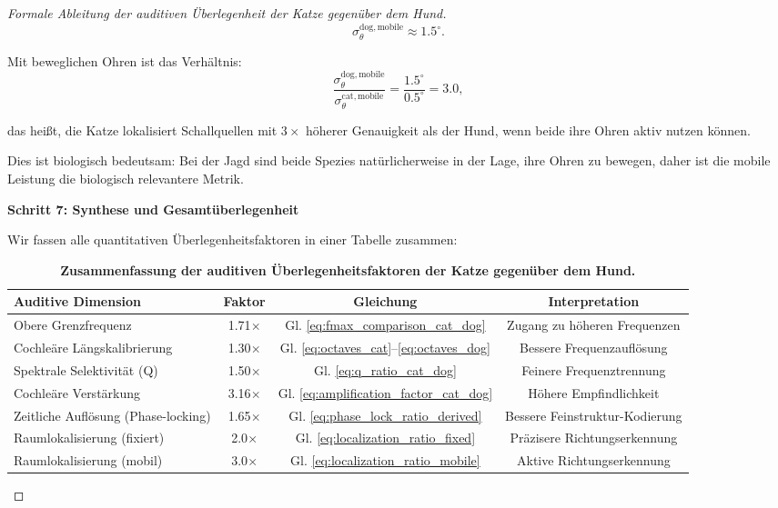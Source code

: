 ﻿\documentclass[12pt, a4paper]{article}
\theoremstyle{definition}
\theoremstyle{remark}
\begin{document}
\begin{proof}[Formale Ableitung der auditiven Überlegenheit der Katze gegenüber dem Hund]
\begin{equation}
\sigma_\theta^{\mathrm{dog, mobile}} \approx 1.5^{\circ}.
\label{eq:localization_dog_mobile}
\end{equation}

Mit beweglichen Ohren ist das Verhältnis:
\begin{equation}
\frac{\sigma_\theta^{\mathrm{dog, mobile}}}{\sigma_\theta^{\mathrm{cat, mobile}}} = \frac{1.5^{\circ}}{0.5^{\circ}} = 3.0,
\label{eq:localization_ratio_mobile}
\end{equation}

das heißt, die Katze lokalisiert Schallquellen mit $3\times$ höherer Genauigkeit als der Hund, wenn beide ihre Ohren aktiv nutzen können.

Dies ist biologisch bedeutsam: Bei der Jagd sind beide Spezies natürlicherweise in der Lage, ihre Ohren zu bewegen, daher ist die mobile Leistung die biologisch relevantere Metrik.

\textbf{Schritt 7: Synthese und Gesamtüberlegenheit}

Wir fassen alle quantitativen Überlegenheitsfaktoren in einer Tabelle zusammen:

\begin{table}[h]
\centering
\small
\caption{\textbf{Zusammenfassung der auditiven Überlegenheitsfaktoren der Katze gegenüber dem Hund.}}
\begin{tabular}{|l|c|c|c|}
\hline
\textbf{Auditive Dimension} & \textbf{Faktor} & \textbf{Gleichung} & \textbf{Interpretation} \\
\hline
Obere Grenzfrequenz & 1.71$\times$ & Gl. \ref{eq:fmax_comparison_cat_dog} & Zugang zu höheren Frequenzen \\
Cochleäre Längskalibrierung & 1.30$\times$ & Gl. \ref{eq:octaves_cat}--\ref{eq:octaves_dog} & Bessere Frequenzauflösung \\
Spektrale Selektivität (Q) & 1.50$\times$ & Gl. \ref{eq:q_ratio_cat_dog} & Feinere Frequenztrennung \\
Cochleäre Verstärkung & 3.16$\times$ & Gl. \ref{eq:amplification_factor_cat_dog} & Höhere Empfindlichkeit \\
Zeitliche Auflösung (Phase-locking) & 1.65$\times$ & Gl. \ref{eq:phase_lock_ratio_derived} & Bessere Feinstruktur-Kodierung \\
Raumlokalisierung (fixiert) & 2.0$\times$ & Gl. \ref{eq:localization_ratio_fixed} & Präzisere Richtungserkennung \\
Raumlokalisierung (mobil) & 3.0$\times$ & Gl. \ref{eq:localization_ratio_mobile} & Aktive Richtungserkennung \\
\hline
\end{tabular}
\label{tab:auditory_superiority_summary}
\end{table}


\end{proof}
\end{document}
